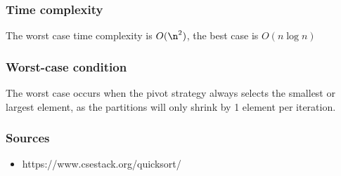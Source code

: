 \documentclass{article}
\begin{document}
\subsubsection{Time complexity}
The worst case time complexity is \(O(\n^2)\), the best case is \(O(n \log n)\)
\subsubsection{Worst-case condition}
The worst case occurs when the pivot strategy always selects the smallest or largest element, as the partitions will only shrink by 1 element per iteration.
\subsubsection{Sources}
\begin{itemize}
    \item https://www.csestack.org/quicksort/
\end{itemize}
\end{document}
